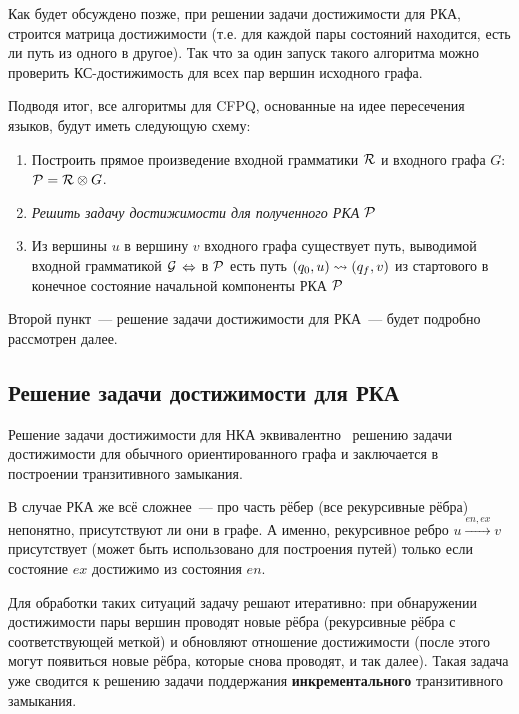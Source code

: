 Как будет обсуждено позже, при решении задачи достижимости для РКА, строится матрица достижимости (т.е. для каждой пары состояний находится, есть ли путь из одного в другое). Так что за один запуск такого алгоритма можно проверить КС-достижимость для всех пар вершин исходного графа. 

Подводя итог, все алгоритмы для CFPQ, основанные на идее пересечения языков, будут иметь следующую схему:
\begin{enumerate}
    \item Построить прямое произведение входной грамматики $\mathcal{R}$ и входного графа $G$: $\mathcal{P} = \mathcal{R} \otimes G$.
    \item \textit{Решить задачу достижимости для полученного РКА $\mathcal{P}$}
    \item Из вершины $u$ в вершину $v$ входного графа существует путь, выводимой входной грамматикой $\mathcal{G}$ $\Leftrightarrow$ в $\mathcal{P}$ есть путь $(q_0, u) \rightsquigarrow (q_f, v)$ из стартового в конечное состояние начальной компоненты РКА $\mathcal{P}$
\end{enumerate}

Второй пункт~--- решение задачи достижимости для РКА~--- будет подробно рассмотрен далее.

\subsection{Решение задачи достижимости для РКА}

Решение задачи достижимости для НКА эквивалентно~\cite{Yannakakis1990} решению задачи достижимости для обычного ориентированного графа и заключается в построении транзитивного замыкания.

\begin{definition}
  \TODO
\end{definition}

В случае РКА же всё сложнее~--- про часть рёбер (все рекурсивные рёбра) непонятно, присутствуют ли они в графе. А именно, рекурсивное ребро $u \xrightarrow{en, ex} v$ присутствует (может быть использовано для построения путей) только если состояние $ex$ достижимо из состояния $en$.

Для обработки таких ситуаций задачу решают итеративно: при обнаружении достижимости пары вершин проводят новые рёбра (рекурсивные рёбра с соответствующей меткой) и обновляют отношение достижимости (после этого могут появиться новые рёбра, которые снова проводят, и так далее). Такая задача уже сводится к решению задачи поддержания {\bf инкрементального} транзитивного замыкания.

